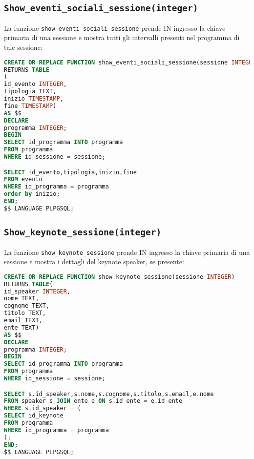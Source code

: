 \subsection{\texttt{Show\_eventi\_sociali\_sessione(integer)}}
La funzione \texttt{show\_eventi\_sociali\_sessione} prende IN ingresso la chiave primaria di una sessione e mostra tutti gli intervalli presenti nel programma di tale sessione:
\begin{lstlisting}[language=SQL,style=mystyle]
CREATE OR REPLACE FUNCTION show_eventi_sociali_sessione(sessione INTEGER)
RETURNS TABLE
(
id_evento INTEGER,
tipologia TEXT,
inizio TIMESTAMP,
fine TIMESTAMP) 
AS $$
DECLARE 
programma INTEGER;
BEGIN
SELECT id_programma INTO programma
FROM programma
WHERE id_sessione = sessione;

SELECT id_evento,tipologia,inizio,fine
FROM evento
WHERE id_programma = programma
order by inizio;
END;
$$ LANGUAGE PLPGSQL;
\end{lstlisting}
\subsection{\texttt{Show\_keynote\_sessione(integer)}}
La funzione \texttt{show\_keynote\_sessione} prende IN ingresso la chiave primaria di una sessione e mostra i dettagli del keynote speaker, se presente:
\begin{lstlisting}[language=SQL,style=mystyle]
CREATE OR REPLACE FUNCTION show_keynote_sessione(sessione INTEGER)
RETURNS TABLE(
id_speaker INTEGER,
nome TEXT,
cognome TEXT,
titolo TEXT,
email TEXT,
ente TEXT) 
AS $$
DECLARE 
programma INTEGER;
BEGIN
SELECT id_programma INTO programma
FROM programma
WHERE id_sessione = sessione;

SELECT s.id_speaker,s.nome,s.cognome,s.titolo,s.email,e.nome
FROM speaker s JOIN ente e ON s.id_ente = e.id_ente
WHERE s.id_speaker = (
SELECT id_keynote
FROM programma
WHERE id_programma = programma
);
END;
$$ LANGUAGE PLPGSQL;
\end{lstlisting}
